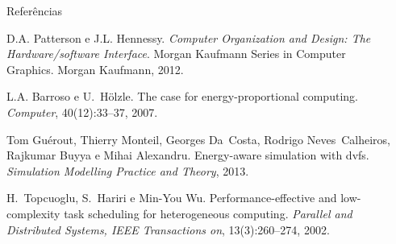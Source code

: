 \documentclass[final]{beamer}
\begin{document}
\begin{frame}[t]
\begin{columns}[t]
\begin{column}{0.35\columnwidth}
	\end{column}

	\begin{column}{0.61\columnwidth}
		\begin{block}{Referências}
			\footnotesize{\begin{thebibliography}{99}
			D.A. Patterson e J.L. Hennessy. {\em Computer Organization and Design: The Hardware/software
			  Interface}. Morgan Kaufmann Series in Computer Graphics. Morgan Kaufmann, 2012.

			L.A. Barroso e U.~H\"olzle.
			The case for energy-proportional computing.
			{\em Computer}, 40(12):33--37, 2007.

			Tom Gu{\'e}rout, Thierry Monteil, Georges Da~Costa, Rodrigo Neves~Calheiros,
			  Rajkumar Buyya e Mihai Alexandru.
			Energy-aware simulation with dvfs.
			{\em Simulation Modelling Practice and Theory}, 2013.

			H.~Topcuoglu, S.~Hariri e Min-You Wu.
			Performance-effective and low-complexity task scheduling for
			  heterogeneous computing.
			{\em Parallel and Distributed Systems, IEEE Transactions on},
			  13(3):260--274, 2002.

			\end{thebibliography}}

		\end{block}
	
	\end{column}
\end{columns}


\end{frame}
\end{document}
